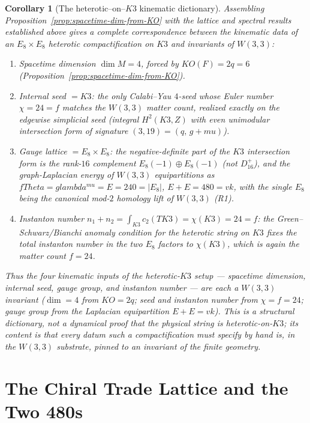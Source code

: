\documentclass[12pt,a4paper]{article}
\def\mathbb#1{#1}%
\def\mathrm#1{#1}%
\def\lambda{lambda}%
\def\mu{mu}%
\def\Theta{Theta}%
\def\cdot{ }%
\newtheorem{corollary}[theorem]{Corollary}
\theoremstyle{definition}
\begin{document}
\begin{corollary}[The heterotic--on--$K3$ kinematic dictionary]
\label{cor:heterotic-K3-dictionary}
Assembling Proposition~\ref{prop:spacetime-dim-from-KO} with the lattice and
spectral results established above gives a complete correspondence between the
\emph{kinematic} data of an $E_8\times E_8$ heterotic compactification on $K3$
and invariants of $W(3,3)$:
\begin{enumerate}
\item \emph{Spacetime dimension} $\dim M=4$, forced by $\mathrm{KO}(F)=2q=6$
  (Proposition~\ref{prop:spacetime-dim-from-KO}).
\item \emph{Internal seed} $=K3$: the only Calabi--Yau $4$-seed whose Euler
  number $\chi=24=f$ matches the $W(3,3)$ matter count, realized exactly on the
  edgewise simplicial seed (integral $H^2(K3,\mathbb Z)$ with even unimodular
  intersection form of signature $(3,19)=(q,\,g+\mu)$).
\item \emph{Gauge lattice} $=E_8\times E_8$: the negative-definite part of the
  $K3$ intersection form is the rank-$16$ complement $E_8(-1)\oplus E_8(-1)$
  (not $D_{16}^+$), and the graph-Laplacian energy of $W(3,3)$ equipartitions as
  $f\cdot\Theta=g\cdot\lambda^{\mu}=E=240=|E_8|$, $E+E=480=vk$, with the single
  $E_8$ being the canonical mod-$2$ homology lift of $W(3,3)$ (R1).
\item \emph{Instanton number} $n_1+n_2=\int_{K3}c_2(TK3)=\chi(K3)=24=f$: the
  Green--Schwarz/Bianchi anomaly condition for the heterotic string on $K3$
  fixes the total instanton number in the two $E_8$ factors to $\chi(K3)$, which
  is again the matter count $f=24$.
\end{enumerate}
Thus the four kinematic inputs of the heterotic-$K3$ setup --- spacetime
dimension, internal seed, gauge group, and instanton number --- are each a
$W(3,3)$ invariant ($\dim=4$ from $\mathrm{KO}=2q$; seed and instanton number
from $\chi=f=24$; gauge group from the Laplacian equipartition $E+E=vk$). This
is a structural dictionary, not a dynamical proof that the physical string is
heterotic-on-$K3$; its content is that every datum such a compactification must
specify by hand is, in the $W(3,3)$ substrate, pinned to an invariant of the
finite geometry.
\end{corollary}

\section{The Chiral Trade Lattice and the Two 480s}
\end{document}
